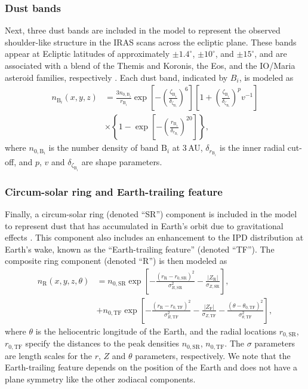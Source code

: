 \documentclass[twocolumn]{aa}
\begin{document}
\subsubsection{Dust bands}
Next, three dust bands are included in the model to represent the
observed shoulder-like structure in the IRAS scans across the ecliptic
plane.  These bands appear at Ecliptic latitudes of approximately
$\pm1.4^\circ$, $\pm10^\circ$, and $\pm15^\circ$, and are associated with
a blend of the Themis and Koronis, the Eos, and the IO/Maria asteroid families, 
respectively \citep{Reach1997}. Each dust band, indicated by $B_i$, is 
modeled as
\begin{align}
    n_{\mathrm{B}_i}(x,y,z) &= \frac{3 n_{0, \mathrm{B}_i}}{r_{\mathrm{B}_i}} \exp \left[-\left(\frac{\zeta_{\mathrm{B}_i}}{\delta_{\zeta_{\mathrm{B}_i}}}\right)^{6}\right]\left[1 + \left(\frac{\zeta_{\mathrm{B}_i}}{\delta_{\zeta_{\mathrm{B}_i}}}\right)^{p}v^{-1}\right] \\
    &\times\left\{1-\exp \left[-\left(\frac{r_{\mathrm{B}_i}}{\delta_{r_{\mathrm{B}_i}}}\right)^{20}\right]\right\},
\label{eq:band}
\end{align}
where $n_{0, \mathrm{B}_i}$ is the number density of band $\mathrm{B}_i$ 
at 3\,AU, $\delta_{r_{\mathrm{B}_i}}$ is the inner radial cut-off, and 
$p$, $v$ and $\delta_{\zeta_{\mathrm{B}_i}}$ are shape parameters.

\subsubsection{Circum-solar ring and Earth-trailing feature}
\label{sec:ring}
Finally, a circum-solar ring (denoted ``SR'') component is included in the
model to represent dust that has accumulated in Earth's orbit due to
gravitational effects \citep{Dermott1994}. This component also
includes an enhancement to the IPD distribution at Earth's wake, known
as the ``Earth-trailing feature'' (denoted ``TF''). The composite ring component (denoted ``R'') is then modeled as
\begin{align}
    n_\mathrm{R}(x, y, z, \theta)&=n_{0, \mathrm{SR}} \exp \left[-\frac{\left(r_\mathrm{R}-r_{0, \mathrm{SR}}\right)^2}{\sigma_{R,\mathrm{SR}} ^2}-\frac{\left| Z_\mathrm{R} \right|}{\sigma_{Z, \mathrm{SR}}}\right],\\
   &+ n_{0, \mathrm{TF}} \exp \left[-\frac{\left(r_\mathrm{R}-r_{0,
          \mathrm{TF}}\right)^{2}}{\sigma_{R,
          \mathrm{TF}}^{2}}-\frac{\left|Z_\mathrm{F}\right|}{\sigma_{Z,
          \mathrm{TF}}}-\frac{\left(\theta-\theta_{0,
          \mathrm{TF}}\right)^{2}}{\sigma_{\theta,\mathrm{TF}}^{2}}\right],
    \label{eq:ring}
\end{align}
where $\theta$ is the heliocentric longitude of the Earth, and the 
radial locations $r_{0, \mathrm{SR}}$, $r_{0, \mathrm{TF}}$ specify
the distances to the peak densities $n_{0, \mathrm{SR}}$, 
$n_{0, \mathrm{TF}}$. The $\sigma$ parameters are length scales for the 
$r$, $Z$ and $\theta$ parameters, respectively. We note that the 
Earth-trailing feature depends on the position of the Earth and does not 
have a plane symmetry like the other zodiacal components. 
\end{document}
